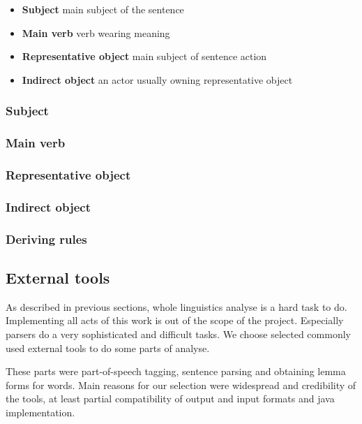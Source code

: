\begin{itemize}
\item {\bf Subject} main subject of the sentence
\item {\bf Main verb} verb wearing meaning
\item {\bf Representative object} main subject of sentence action
\item {\bf Indirect object} an actor usually owning representative object
\end{itemize}




\subsubsection{Subject}

\subsubsection{Main verb}

\subsubsection{Representative object}

\subsubsection{Indirect object}


\subsubsection{Deriving rules}



\subsection{External tools}
\label{sec:externaltools}
As described in previous sections, whole linguistics analyse is a hard task to do. Implementing all acts of this work is out of the scope of the project.  Especially parsers do a very sophisticated and difficult tasks. We choose selected commonly used external tools to do some parts of analyse. 

These parts were part-of-speech tagging, sentence parsing and obtaining lemma forms for words. Main reasons for our selection were widespread  and credibility of the tools, at least partial compatibility of output and input formats and java implementation. 


